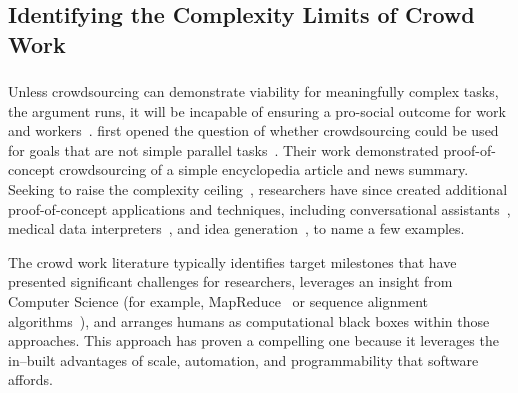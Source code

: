 \documentclass[trackingWork]{subfiles}
\begin{document}
\begin{comment}
Crowdwork
  - Kittur said let's do complex stuff
  - This works by using CS techniques
  - Clear that this works in focused cases
  - More recent shift toward using experts
\end{comment}

\subsection[What are the complexity limits of crowd work]{Identifying the Complexity Limits of Crowd Work}\label{sec:complexity}

\subsubsection{\crowdworkpers}

Unless crowdsourcing can demonstrate viability for meaningfully complex tasks, the argument runs, it will be incapable of ensuring a pro-social outcome for work and workers~\cite{crowdworkFuture}.
\citeauthor{crowdForgeKittur} first opened the question of whether crowdsourcing could be used for goals that are not simple parallel tasks~\cite{crowdForgeKittur}.
Their work demonstrated proof-of-concept crowdsourcing of a simple encyclopedia article and news summary.
Seeking to raise the complexity ceiling~\cite{myers2000past}, researchers have since created additional proof-of-concept applications and techniques, including conversational assistants~\cite{Lasecki:2013:CCC:2501988.2502057}, medical data interpreters~\cite{Lasecki:2013:CCC:2501988.2502057}, and idea generation~\cite{YuEncouragingOutside,yu2014distributed,Yu2016a}, to name a few examples.

The crowd work literature typically identifies target milestones that have presented significant challenges for researchers, leverages an insight from Computer Science (for example, MapReduce~\cite{crowdForgeKittur} or sequence alignment algorithms~\cite{lasecki2012real}), and arranges humans as computational black boxes within those approaches.
This approach has proven a compelling one because
it leverages the in--built advantages of scale, automation, and programmability that software affords.
\end{document}
